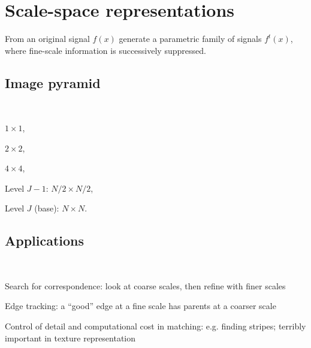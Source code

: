 \chapter{Scale-space representations}
From an original signal $f(x)$ generate a parametric family of signals $f^t(x)$, where fine-scale information is successively suppressed.
\section{Image pyramid}\hfill\\
\begin{enumerate*}[label=\protect\circled{\arabic*},itemjoin=]
	\setcounter{enumi}{-1}
	\item $1\times1$,\\
	\item $2\times2$,\\
	\item $4\times 4$,\\
	\item[Level $J-1$:] $N/2\times N/2$,\\
	\item[Level $J$ (base):] $N\times N$.
\end{enumerate*}
\section{Applications}\hfill\\
\begin{enumerate*}[label=\protect\circled{\arabic*},itemjoin=]
	\item Search for correspondence: look at coarse scales, then refine with finer scales\\
	\item Edge tracking: a ``good'' edge at a fine scale has parents at a coarser scale\\
	\item Control of detail and computational cost in matching: e.g. finding stripes; terribly important in texture representation\\
\end{enumerate*}
